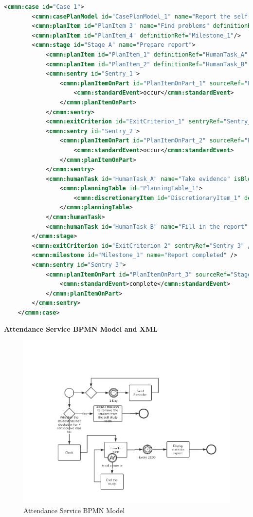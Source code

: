 \documentclass[runningheads]{llncs}
\begin{document}
	\begin{lstlisting}[language={XML}]
	<cmmn:case id="Case_1">
		<cmmn:casePlanModel id="CasePlanModel_1" name="Report the self-study room">
		<cmmn:planItem id="PlanItem_3" name="Find problems" definitionRef="UserEventListener_1"/>
		<cmmn:planItem id="PlanItem_4" definitionRef="Milestone_1"/>
		<cmmn:stage id="Stage_A" name="Prepare report">
			<cmmn:planItem id="PlanItem_1" definitionRef="HumanTask_A" />
			<cmmn:planItem id="PlanItem_2" definitionRef="HumanTask_B" />
			<cmmn:sentry id="Sentry_1">
				<cmmn:planItemOnPart id="PlanItemOnPart_1" sourceRef="PlanItem_3">
					<cmmn:standardEvent>occur</cmmn:standardEvent>
				</cmmn:planItemOnPart>
			</cmmn:sentry>
			<cmmn:exitCriterion id="ExitCriterion_1" sentryRef="Sentry_2" />
			<cmmn:sentry id="Sentry_2">
				<cmmn:planItemOnPart id="PlanItemOnPart_2" sourceRef="PlanItem_2">
					<cmmn:standardEvent>occur</cmmn:standardEvent>
				</cmmn:planItemOnPart>
			</cmmn:sentry>
			<cmmn:humanTask id="HumanTask_A" name="Take evidence" isBlocking="true">
				<cmmn:planningTable id="PlanningTable_1">
					<cmmn:discretionaryItem id="DiscretionaryItem_1" definitionRef="Check self-study room management rules" />
				</cmmn:planningTable>
			</cmmn:humanTask>
			<cmmn:humanTask id="HumanTask_B" name="Fill in the report" isBlocking="true" />
		</cmmn:stage>
		<cmmn:exitCriterion id="ExitCriterion_2" sentryRef="Sentry_3" />
		<cmmn:milestone id="Milestone_1" name="Report completed" />
		<cmmn:sentry id="Sentry_3">
			<cmmn:planItemOnPart id="PlanItemOnPart_3" sourceRef="Stage_A">
				<cmmn:standardEvent>complete</cmmn:standardEvent>
			</cmmn:planItemOnPart>
		</cmmn:sentry>
	</cmmn:case>

	\end{lstlisting}
	\clearpage
	\textbf{Attendance Service BPMN Model and XML}\\
	\begin{figure}
		\centering %
		\includegraphics[width=1.0\textwidth]{figure/llt/attendanceservicebpmn} %
		\caption{Attendance Service BPMN Model} %
		\label{Attendance} %
	\end{figure}
\end{document}
